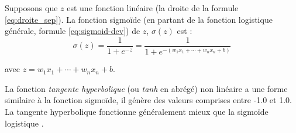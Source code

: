 	
	
	

	
	Supposons que $z$ est une fonction linéaire (la droite de la formule \ref{eq:droite_sep}). La fonction sigmoïde (en partant de la fonction logistique générale, formule \ref{eq:sigmoid-dev}) de $z$, $\sigma (z)$ est :
	\begin{equation}\label{eq:sigmoid-activation}
	{\displaystyle \sigma (z)= {\frac {1}{1+e^{-z}}} ={\frac {1}{1+e^{-(w _{1}x_{1}+\cdots +w_{n}x_{n}+b)}}}}
	\end{equation} 
	
	avec $z = w _{1}x_{1}+\cdots +w_{n}x_{n}+b$.
	
	
	La fonction \textit{tangente hyperbolique} (ou {\textit{tanh}} en abrégé) non linéaire a une forme similaire à la fonction sigmoïde, il génère des valeurs comprises entre -1.0 et 1.0. La tangente hyperbolique fonctionne généralement mieux que la sigmoïde logistique \cite{goodfellow2016deep}.
	
	
	
	

